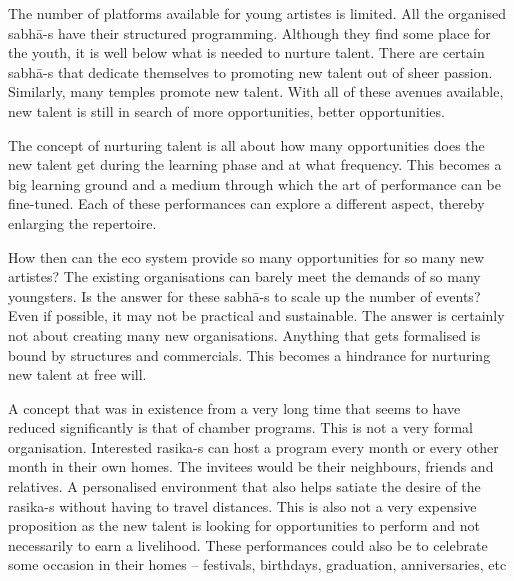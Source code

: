 \begin{itemize}
\begin{myquote}
The number of platforms available for young artistes is limited. All the organised sabhā-s have their structured programming. Although they find some place for the youth, it is well below what is needed to nurture talent. There are certain sabhā-s that dedicate themselves to promoting new talent out of sheer passion. Similarly, many temples promote new talent. With all of these avenues available, new talent is still in search of more opportunities, better opportunities.
\end{myquote}

\begin{myquote}
The concept of nurturing talent is all about how many opportunities does the new talent get during the learning phase and at what frequency. This becomes a big learning ground and a medium through which the art of performance can be fine-tuned. Each of these performances can explore a different aspect, thereby enlarging the repertoire.
\end{myquote}

\begin{myquote}
How then can the eco system provide so many opportunities for so many new artistes? The existing organisations can barely meet the demands of so many youngsters. Is the answer for these sabhā-s to scale up the number of events? Even if possible, it may not be practical and sustainable. The answer is certainly not about creating many new organisations. Anything that gets formalised is bound by structures and commercials. This becomes a hindrance for nurturing new talent at free will.
\end{myquote}

\begin{myquote}
A concept that was in existence from a very long time that seems to have reduced significantly is that of chamber programs. This is not a very formal organisation. Interested rasika-s can host a program every month or every other month in their own homes. The invitees would be their neighbours, friends and relatives. A personalised environment that also helps satiate the desire of the rasika-s without having to travel distances. This is also not a very expensive proposition as the new talent is looking for opportunities to perform and not necessarily to earn a livelihood. These performances could also be to celebrate some occasion in their homes – festivals, birthdays, graduation, anniversaries, etc
\end{myquote}


\end{itemize}
